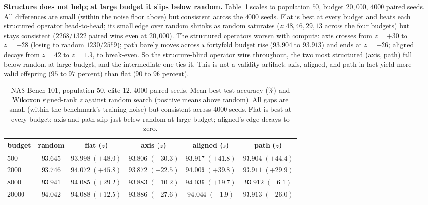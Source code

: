 \documentclass[11pt]{article}
\begin{document}
\textbf{Structure does not help; at large budget it slips below random.}
Table~\ref{tab:scaled} scales to population $50$, budget $20{,}000$, $4000$ paired seeds. All
differences are small (within the noise floor above) but consistent across the $4000$ seeds.
Flat is best at every budget and beats each structured operator head-to-head; its small edge
over random shrinks as random saturates ($z: 48, 46, 29, 13$ across the four budgets) but stays
consistent ($2268/1322$ paired wins even at $20{,}000$). The structured operators worsen with
compute: axis crosses from $z=+30$ to $z=-28$ (losing to random $1230/2559$); path barely moves
across a fortyfold budget rise ($93.904$ to $93.913$) and ends at $z=-26$; aligned decays from
$z=42$ to $z=1.9$, to break-even. So the structure-blind operator wins throughout, the two most
structured (axis, path) fall below random at large budget, and the intermediate one ties it.
This is not a validity artifact: axis, aligned, and path in fact yield more valid offspring
($95$ to $97$ percent) than flat ($90$ to $96$ percent).

\begin{table}[t]
\centering
\caption{NAS-Bench-101, population $50$, elite $12$, $4000$ paired seeds. Mean best
test-accuracy (\%) and Wilcoxon signed-rank $z$ against random search (positive means above
random). All gaps are small (within the benchmark's training noise) but consistent across
$4000$ seeds. Flat is best at every budget; axis and path slip just below random at large
budget; aligned's edge decays to zero.}
\label{tab:scaled}
\begin{tabular}{lccccc}
\toprule
budget & random & flat ($z$) & axis ($z$) & aligned ($z$) & path ($z$) \\
\midrule
$500$   & $93.645$ & $\mathbf{93.998}\;(+48.0)$ & $93.806\;(+30.3)$ & $93.917\;(+41.8)$ & $93.904\;(+44.4)$ \\
$2000$  & $93.746$ & $\mathbf{94.072}\;(+45.8)$ & $93.872\;(+22.5)$ & $94.009\;(+39.8)$ & $93.911\;(+29.9)$ \\
$8000$  & $93.941$ & $\mathbf{94.085}\;(+29.2)$ & $93.883\;(-10.2)$ & $94.036\;(+19.7)$ & $93.912\;(-6.1)$ \\
$20000$ & $94.042$ & $\mathbf{94.088}\;(+12.5)$ & $93.886\;(-27.6)$ & $94.044\;(+1.9)$ & $93.913\;(-26.0)$ \\
\bottomrule
\end{tabular}
\end{table}
\end{document}
